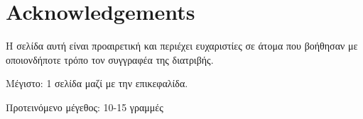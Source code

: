 \chapter*{Acknowledgements}
\thispagestyle{empty}

Η σελίδα αυτή είναι προαιρετική και περιέχει ευχαριστίες σε άτομα
που βοήθησαν με οποιονδήποτε τρόπο τον συγγραφέα της διατριβής.

\y\noindent Μέγιστο: 1 σελίδα μαζί με την επικεφαλίδα.

\y\noindent Προτεινόμενο μέγεθος: 10-15 γραμμές
